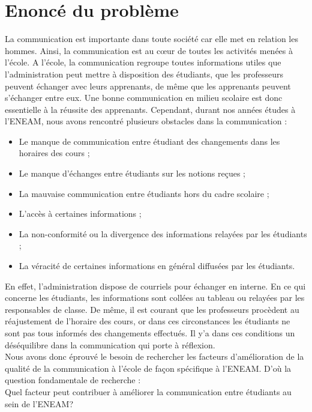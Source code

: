 \documentclass[a4paper,12pt,french]{report} %
\begin{document}
\section{Enoncé du problème}
La communication est importante dans toute société car elle met en relation les hommes. Ainsi, la communication est au c\oe{}ur de toutes les activités menées à l’école. A l’école, la communication regroupe toutes informations utiles que l'administration peut mettre à disposition des étudiants, que les professeurs peuvent échanger avec leurs apprenants, de même que les apprenants peuvent s'échanger entre eux. Une bonne communication en milieu scolaire est donc essentielle à la réussite des apprenants. Cependant, durant nos années études à l'ENEAM, nous avons rencontré plusieurs obstacles dans la communication :
\begin{itemize}
	\item Le manque de communication entre étudiant des changements dans les horaires des cours ; 
	\item Le manque d’échanges entre étudiants sur les notions reçues ; 
	\item La mauvaise communication entre étudiants hors du cadre scolaire ;
	\item L’accès à certaines informations ; 
	\item La non-conformité ou la divergence des informations relayées par les étudiants ;
	\item La véracité de certaines informations en général diffusées par les étudiants.
\end{itemize}
	En effet, l'administration dispose de courriels pour échanger en interne. En ce qui concerne les étudiants, les informations sont collées au tableau ou  relayées par les responsables de classe. De même, il est courant que les professeurs procèdent au réajustement de l'horaire des cours, or dans ces circonstances les étudiants ne sont pas tous informés des changements effectués. Il y'a dans ces conditions un déséquilibre dans la communication qui porte à réflexion.\\
Nous avons donc éprouvé le besoin de rechercher les facteurs d'amélioration de la qualité de la communication à l'école de façon spécifique à l'ENEAM. D'où la question fondamentale de recherche : \\
Quel facteur peut contribuer à améliorer la communication entre étudiants au sein de l'ENEAM?
\end{document}
